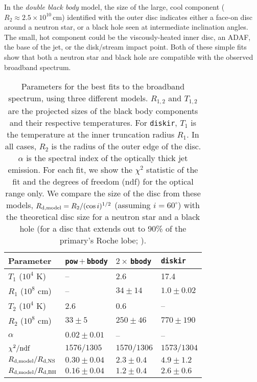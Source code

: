 \documentclass[a4paper,fleqn,usenatbib]{mnras}
\begin{document}
In the {\it double black body} model, the size of the large, cool component ($R_2 \approx 2.5 \times 10^{10}$\,cm) identified with the outer disc indicates either a face-on disc around a neutron star, or a black hole seen at intermediate inclination angles. The small, hot component could be the viscously-heated inner disc, an ADAF, the base of the jet, or the disk/stream impact point. Both of these simple fits show that both a neutron star and black hole are compatible with the observed broadband spectrum. 

\begin{table}
\centering
\begin{minipage}{\columnwidth}
	\centering
	\caption{Parameters for the best fits to the broadband spectrum, using three different models. $R_{1,2}$ and $T_{1,2}$ are the projected sizes of the black body components and their respective temperatures. For {\tt diskir}, $T_1$ is the temperature at the inner truncation radius $R_1$. In all cases, $R_2$ is the radius of the outer edge of the disc. $\alpha$ is the spectral index of the optically thick jet emission. For each fit, we show the $\chi^2$ statistic of the fit and the degrees of freedom (ndf) for the optical range only. We compare the size of the disc from these models, $R_{\rm d, model} = R_2 / (\cos i)^{1/2}$ (assuming $i = 60^{\circ}$) with the theoretical disc size for a neutron star and a black hole (for a disc that extends out to 90\% of the primary's Roche lobe; \citealp{2012A&A...537A.104V}).}
	\begin{tabular}{llll}
	\hline
	Parameter & {\tt pow}\,$+$\,{\tt bbody} & $2\times$\,{\tt bbody} & {\tt diskir} \\
	\hline
	\hline
	$T_1$ ($10^4$ K) & -- & 2.6 & 17.4 \\
	$R_{1}$ ($10^8$ cm) & -- & $34\pm14$ & $1.0\pm0.02$ \\
	$T_2$ ($10^4$ K) & 2.6 & 0.6 & -- \\
	$R_{2}$ ($10^8$ cm) & $33\pm5$ & $250\pm46$ & $770\pm190$ \\
	$\alpha$ & $0.02\pm0.01$ & -- & -- \\
	\hline
	$\rm \chi^2/ndf$ & $1576/1305$ & $1570/1306$ & $1573/1304$ \\
	$R_{\rm d, model}/R_{\rm d, NS}$ & $0.30\pm0.04$ & $2.3\pm0.4$& $4.9\pm1.2$\\
	$R_{\rm d, model}/R_{\rm d, BH}$ & $0.16\pm0.04$ & $1.2\pm0.4$& $2.6\pm0.6$\\
	\hline
	\hline
	\end{tabular}
	\label{tab:models}
\end{minipage}
\end{table}
\end{document}
